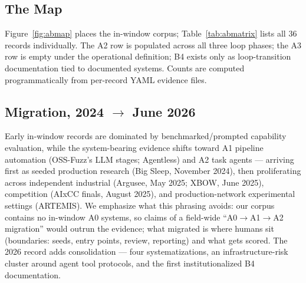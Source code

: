 \subsection{The Map}
Figure~\ref{fig:abmap} places the in-window corpus; Table~\ref{tab:abmatrix} lists all 36
records individually. The A2 row is populated across all three loop phases; the A3 row is
empty under the operational definition; B4 exists only as loop-transition documentation tied to
documented systems. Counts are computed programmatically from per-record YAML evidence files.



\subsection{Migration, 2024 $\rightarrow$ June 2026}
Early in-window records are dominated by benchmarked/prompted capability evaluation, while the
system-bearing evidence shifts toward A1 pipeline automation (OSS-Fuzz's LLM stages; Agentless)
and A2 task agents --- arriving first as seeded production research (Big Sleep, November 2024),
then proliferating across independent industrial (Argusee, May 2025; XBOW, June 2025),
competition (AIxCC finals, August 2025), and production-network experimental settings (ARTEMIS).
We emphasize what this phrasing avoids: our corpus contains no in-window A0 systems, so claims
of a field-wide ``A0$\rightarrow$A1$\rightarrow$A2 migration'' would outrun the evidence; what
migrated is where humans sit (boundaries: seeds, entry points, review, reporting) and what gets
scored. The 2026 record adds consolidation --- four systematizations, an infrastructure-risk
cluster around agent tool protocols, and the first institutionalized B4 documentation.


